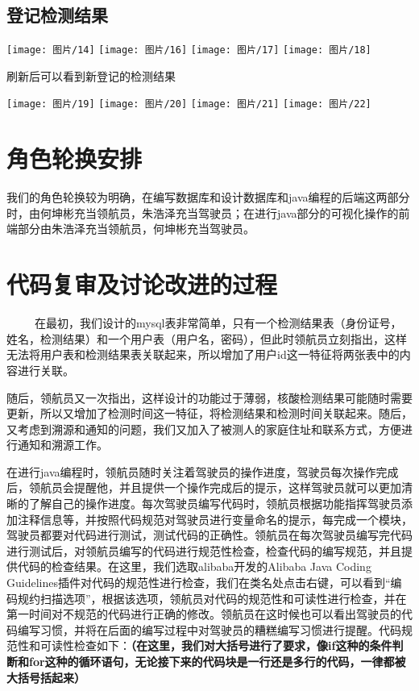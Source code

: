 \documentclass{article}
\begin{document}
\subsection{登记检测结果}
\begin{center}
\texttt{[image: 图片/14]}
\texttt{[image: 图片/16]}
\texttt{[image: 图片/17]}
\texttt{[image: 图片/18]}
\end{center}

刷新后可以看到新登记的检测结果

\begin{center}
\texttt{[image: 图片/19]}
\texttt{[image: 图片/20]}
\texttt{[image: 图片/21]}
\texttt{[image: 图片/22]}
\end{center}
\section{角色轮换安排}
我们的角色轮换较为明确，在编写数据库和设计数据库和java编程的后端这两部分时，由何坤彬充当领航员，朱浩泽充当驾驶员；在进行java部分的可视化操作的前端部分由朱浩泽充当领航员，何坤彬充当驾驶员。
\section{代码复审及讨论改进的过程}
\ \ \ \ \ 在最初，我们设计的mysql表非常简单，只有一个检测结果表（身份证号，姓名，检测结果）和一个用户表（用户名，密码），但此时领航员立刻指出，这样无法将用户表和检测结果表关联起来，所以增加了用户id这一特征将两张表中的内容进行关联。

随后，领航员又一次指出，这样设计的功能过于薄弱，核酸检测结果可能随时需要更新，所以又增加了检测时间这一特征，将检测结果和检测时间关联起来。随后，又考虑到溯源和通知的问题，我们又加入了被测人的家庭住址和联系方式，方便进行通知和溯源工作。

在进行java编程时，领航员随时关注着驾驶员的操作进度，驾驶员每次操作完成后，领航员会提醒他，并且提供一个操作完成后的提示，这样驾驶员就可以更加清晰的了解自己的操作进度。每次驾驶员编写代码时，领航员根据功能指挥驾驶员添加注释信息等，并按照代码规范对驾驶员进行变量命名的提示，每完成一个模块，驾驶员都要对代码进行测试，测试代码的正确性。领航员在每次驾驶员编写完代码进行测试后，对领航员编写的代码进行规范性检查，检查代码的编写规范，并且提供代码的检查结果。在这里，我们选取alibaba开发的Alibaba Java Coding Guidelines插件对代码的规范性进行检查，我们在类名处点击右键，可以看到“编码规约扫描选项”，根据该选项，领航员对代码的规范性和可读性进行检查，并在第一时间对不规范的代码进行正确的修改。领航员在这时候也可以看出驾驶员的代码编写习惯，并将在后面的编写过程中对驾驶员的糟糕编写习惯进行提醒。代码规范性和可读性检查如下：\textbf{（在这里，我们对大括号进行了要求，像if这种的条件判断和for这种的循环语句，无论接下来的代码块是一行还是多行的代码，一律都被大括号括起来）}
\end{document}
